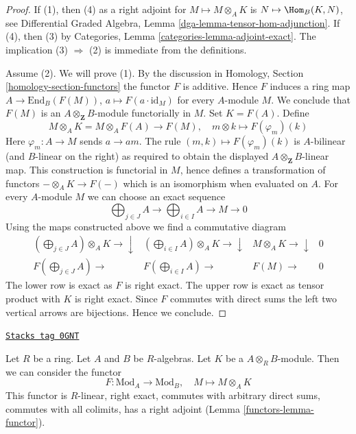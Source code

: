 \begin{proof}
If (1), then (4) as a right adjoint for $M \mapsto M \otimes_A K$
is $N \mapsto \Hom_B(K, N)$, see
Differential Graded Algebra, Lemma \ref{dga-lemma-tensor-hom-adjunction}.
If (4), then (3) by Categories, Lemma \ref{categories-lemma-adjoint-exact}.
The implication (3) $\Rightarrow$ (2) is immediate from the definitions.

\medskip\noindent
Assume (2). We will prove (1). By the discussion in
Homology, Section \ref{homology-section-functors}
the functor $F$ is additive. Hence $F$ induces
a ring map $A \to \text{End}_B(F(M))$, $a \mapsto F(a \cdot \text{id}_M)$
for every $A$-module $M$. We conclude that $F(M)$ is an
$A \otimes_\mathbf{Z} B$-module functorially in $M$.
Set $K = F(A)$. Define
$$
M \otimes_A K = M \otimes_A F(A) \longrightarrow F(M),
\quad m \otimes k \longmapsto F(\varphi_m)(k)
$$
Here $\varphi_m : A \to M$ sends $a \to am$. The rule
$(m, k) \mapsto F(\varphi_m)(k)$ is $A$-bilinear (and $B$-linear
on the right) as required to obtain the displayed
$A \otimes_\mathbf{Z} B$-linear map.
This construction is functorial in $M$, hence defines a transformation
of functors $- \otimes_A K \to F(-)$ which is an isomorphism when
evaluated on $A$. For every $A$-module $M$ we can choose an exact sequence
$$
\bigoplus\nolimits_{j \in J} A \to
\bigoplus\nolimits_{i \in I} A \to
M \to 0
$$
Using the maps constructed above we find a commutative diagram
$$
\begin{array}{cccc}(\bigoplus\nolimits_{j \in J} A) \otimes_A K \longrightarrow\downarrow & (\bigoplus\nolimits_{i \in I} A) \otimes_A K \longrightarrow\downarrow & M \otimes_A K \longrightarrow\downarrow & 0 \\ F(\bigoplus\nolimits_{j \in J} A) \longrightarrow & F(\bigoplus\nolimits_{i \in I} A) \longrightarrow & F(M) \longrightarrow & 0\end{array}
$$
The lower row is exact as $F$ is right exact.
The upper row is exact as tensor product with $K$ is right exact.
Since $F$ commutes with direct sums the left two vertical arrows
are bijections. Hence we conclude.
\end{proof}

\begin{example}
\label{functors-example-functor-modules}
\href{https://stacks.math.columbia.edu/tag/0GNT}{\texttt{Stacks tag 0GNT}}

Let $R$ be a ring. Let $A$ and $B$ be $R$-algebras. Let $K$ be a
$A \otimes_R B$-module. Then we can consider the functor
\begin{equation}
\label{equation-FM-modules}
F : \text{Mod}_A \longrightarrow \text{Mod}_B,\quad
M \longmapsto M \otimes_A K
\end{equation}
This functor is $R$-linear, right exact,
commutes with arbitrary direct sums, commutes
with all colimits, has a right adjoint (Lemma \ref{functors-lemma-functor}).
\end{example}

